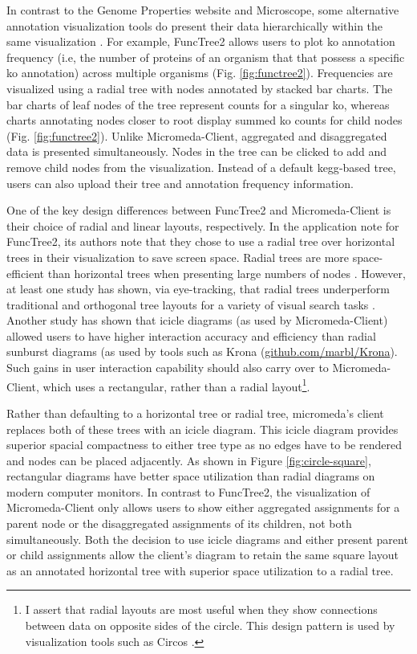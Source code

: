 In contrast to the Genome Properties website and Microscope, some alternative annotation visualization tools do present their data hierarchically within the same visualization \cite{darzi2019functree2}. For example, FuncTree2 \cite{darzi2019functree2} allows users to plot \gls{ko}  annotation \cite{mao2005automated,kanehisa2011kegg} frequency (i.e, the number of proteins of an organism that that possess a specific \gls{ko}  annotation) across multiple organisms (Fig. \ref{fig:functree2}). Frequencies are visualized using a radial tree with nodes annotated by stacked bar charts. The bar charts of leaf nodes of the tree represent counts for a singular \gls{ko}, whereas charts annotating nodes closer to root display summed \gls{ko}  counts for child nodes (Fig. \ref{fig:functree2}). Unlike Micromeda-Client, aggregated and disaggregated data is presented simultaneously. Nodes in the tree can be clicked to add and remove child nodes from the visualization. Instead of a default \gls{kegg}-based tree, users can also upload their tree and annotation frequency information.

One of the key design differences between FuncTree2 and Micromeda-Client is their choice of radial and linear layouts, respectively. In the application note for FuncTree2, its authors note that they chose to use a radial tree over horizontal trees in their visualization to save screen space. Radial trees are more space-efficient than horizontal trees when presenting large numbers of nodes \cite{burch2011evaluation}. However, at least one study has shown, via eye-tracking, that radial trees underperform traditional and orthogonal tree layouts for a variety of visual search tasks \cite{burch2011evaluation}. Another study has shown that icicle diagrams (as used by Micromeda-Client) allowed users to have higher interaction accuracy and efficiency \cite{muramalla2017radial} than radial sunburst diagrams (as used by tools such as Krona \cite{ondov2011interactive} (\href{http://github.com/marbl/Krona}{github.com/marbl/Krona}).
Such gains in user interaction capability should also carry over to Micromeda-Client, which uses a rectangular, rather than a radial layout\footnote{I assert that radial layouts are most useful when they show connections between data on opposite sides of the circle. This design pattern is used by visualization tools such as Circos \cite{krzywinski2009circos}.}.

Rather than defaulting to a horizontal tree or radial tree, micromeda's client replaces both of these trees with an icicle diagram. This icicle diagram provides superior spacial compactness to either tree type as no edges have to be rendered and nodes can be placed adjacently. As shown in Figure \ref{fig:circle-square}, rectangular diagrams have better space utilization than radial diagrams on modern computer monitors. In contrast to FuncTree2, the visualization of Micromeda-Client only allows users to show either aggregated assignments for a parent node or the disaggregated assignments of its children, not both simultaneously. Both the decision to use icicle diagrams and either present parent or child assignments allow the client's diagram to retain the same square layout as an annotated horizontal tree with superior space utilization to a radial tree. 

